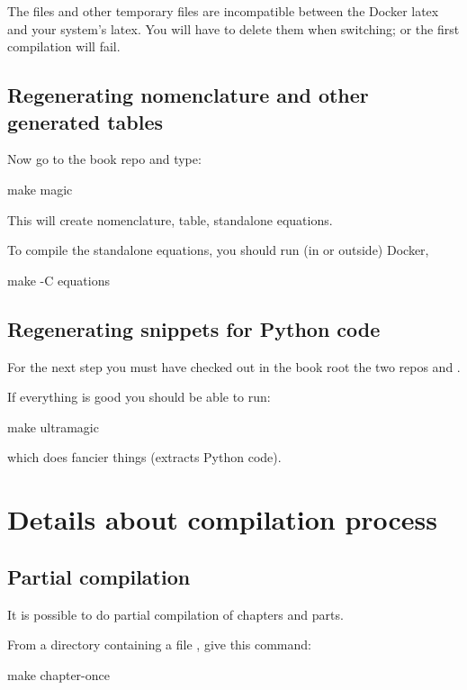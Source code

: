 \begin{remark}
    The  files and other temporary files are incompatible between the Docker latex and your system's latex.
    You will have to delete them when switching; or the first compilation will fail.
\end{remark}

\subsection{Regenerating nomenclature and other generated tables}

Now go to the book repo and type:
%
\begin{console}
    make magic
\end{console}
%
This will create nomenclature, table, standalone equations.

To compile the standalone equations, you should run (in or outside) Docker,
%
\begin{console}
    make -C equations
\end{console}

\subsection{Regenerating snippets for Python code}

For the next step you must have checked out in the book root the two repos  and .

If everything is good you should be able to run:
%
\begin{console}
    make ultramagic
\end{console}
%
which does fancier things (extracts Python code).

\section{Details about compilation process}

\subsection{Partial compilation}

It is possible to do partial compilation of chapters and parts.

From a directory containing a file , give this command:
%
\begin{console}
    make chapter-once
\end{console}

